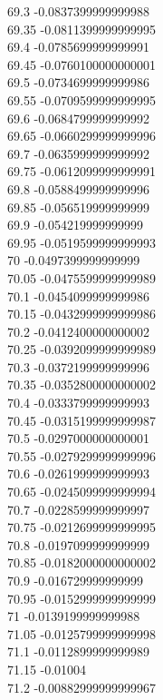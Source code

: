 {69.3	-0.0837399999999988\\
69.35	-0.0811399999999995\\
69.4	-0.0785699999999991\\
69.45	-0.0760100000000001\\
69.5	-0.0734699999999986\\
69.55	-0.0709599999999995\\
69.6	-0.0684799999999992\\
69.65	-0.0660299999999996\\
69.7	-0.0635999999999992\\
69.75	-0.0612099999999991\\
69.8	-0.0588499999999996\\
69.85	-0.056519999999999\\
69.9	-0.054219999999999\\
69.95	-0.0519599999999993\\
70	-0.0497399999999999\\
70.05	-0.0475599999999989\\
70.1	-0.0454099999999986\\
70.15	-0.0432999999999986\\
70.2	-0.0412400000000002\\
70.25	-0.0392099999999989\\
70.3	-0.0372199999999996\\
70.35	-0.0352800000000002\\
70.4	-0.0333799999999993\\
70.45	-0.0315199999999987\\
70.5	-0.0297000000000001\\
70.55	-0.0279299999999996\\
70.6	-0.0261999999999993\\
70.65	-0.0245099999999994\\
70.7	-0.0228599999999997\\
70.75	-0.0212699999999995\\
70.8	-0.0197099999999999\\
70.85	-0.0182000000000002\\
70.9	-0.016729999999999\\
70.95	-0.0152999999999999\\
71	-0.0139199999999988\\
71.05	-0.0125799999999998\\
71.1	-0.0112899999999989\\
71.15	-0.01004\\
71.2	-0.00882999999999967\\
}
